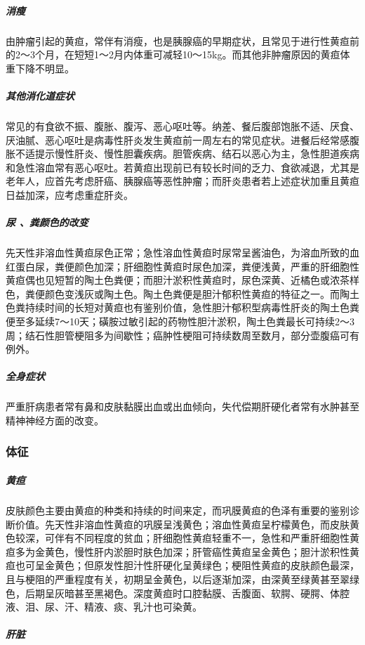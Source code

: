 \subparagraph{消瘦}

由肿瘤引起的黄疸，常伴有消瘦，也是胰腺癌的早期症状，且常见于进行性黄疸前的2～3个月，在短短1～2月内体重可减轻10～15kg。而其他非肿瘤原因的黄疸体重下降不明显。

\subparagraph{其他消化道症状}

常见的有食欲不振、腹胀、腹泻、恶心呕吐等。纳差、餐后腹部饱胀不适、厌食、厌油腻、恶心呕吐是病毒性肝炎发生黄疸前一周左右的常见症状。进餐后经常感腹胀不适提示慢性肝炎、慢性胆囊疾病。胆管疾病、结石以恶心为主，急性胆道疾病和急性溶血常有恶心呕吐。若黄疸出现前已有较长时间的乏力、食欲减退，尤其是老年人，应首先考虑肝癌、胰腺癌等恶性肿瘤；而肝炎患者若上述症状加重且黄疸日益加深，应考虑重症肝炎。

\subparagraph{尿 、粪颜色的改变}

先天性非溶血性黄疸尿色正常；急性溶血性黄疸时尿常呈酱油色，为溶血所致的血红蛋白尿，粪便颜色加深；肝细胞性黄疸时尿色加深，粪便浅黄，严重的肝细胞性黄疸偶也见短暂的陶土色粪便；而胆汁淤积性黄疸时，尿色深黄、近橘色或浓茶样色，粪便颜色变浅灰或陶土色。陶土色粪便是胆汁郁积性黄疸的特征之一。而陶土色粪持续时间的长短对黄疸也有鉴别价值，急性胆汁郁积型病毒性肝炎的陶土色粪便至多延续7～10天；磺胺过敏引起的药物性胆汁淤积，陶土色粪最长可持续2～3周；结石性胆管梗阻多为间歇性；癌肿性梗阻可持续数周至数月，部分壶腹癌可有例外。

\subparagraph{全身症状}

严重肝病患者常有鼻和皮肤黏膜出血或出血倾向，失代偿期肝硬化者常有水肿甚至精神神经方面的改变。

\subsubsection{体征}

\subparagraph{黄疸}

皮肤颜色主要由黄疸的种类和持续的时间来定，而巩膜黄疸的色泽有重要的鉴别诊断价值。先天性非溶血性黄疸的巩膜呈浅黄色；溶血性黄疸呈柠檬黄色，而皮肤黄色较深，可伴有不同程度的贫血；肝细胞性黄疸轻重不一，急性和严重肝细胞性黄疸多为金黄色，慢性肝内淤胆时肤色加深；肝管癌性黄疸呈金黄色；胆汁淤积性黄疸也可呈金黄色；但原发性胆汁性肝硬化呈黄绿色；梗阻性黄疸的皮肤颜色最深，且与梗阻的严重程度有关，初期呈金黄色，以后逐渐加深，由深黄至绿黄甚至翠绿色，后期呈灰暗甚至黑褐色。深度黄疸时口腔黏膜、舌腹面、软腭、硬腭、体腔液、泪、尿、汗、精液、痰、乳汁也可染黄。

\subparagraph{肝脏}

